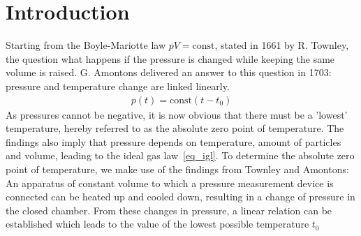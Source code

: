 \section{Introduction}
    Starting from the Boyle-Mariotte law $pV = \text{const}$, stated in 1661 by R. Townley, the question what happens if the pressure is changed while keeping the same volume is raised.
    G. Amontons delivered an answer to this question in 1703: pressure and temperature change are linked linearly.
    \begin{align}
        p(t) = \text{const} (t - t_0)
    \end{align}
    As pressures cannot be negative, it is now obvious that there must be a 'lowest' temperature, hereby referred to as the absolute zero point of temperature. 
    The findings also imply that pressure depends on temperature, amount of particles and volume, leading to the ideal gas law~\ref{eq_igl}.
    To determine the absolute zero point of temperature, we make use of the findings from Townley and Amontons:
    An apparatus of constant volume to which a pressure measurement device is connected can be heated up and cooled down, resulting in a change of pressure in the closed chamber.
    From these changes in pressure, a linear relation can be established which leads to the value of the lowest possible temperature $t_0$

